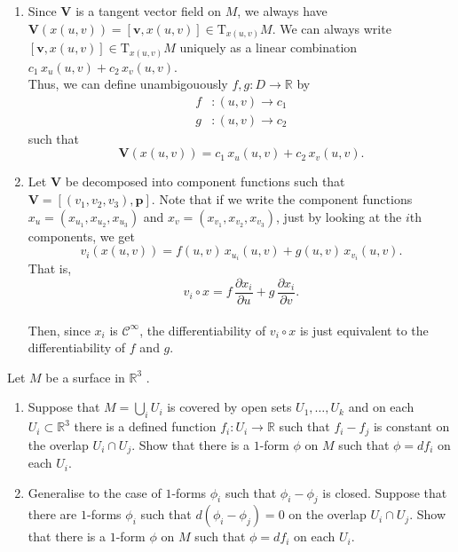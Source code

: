 \documentclass[12 pt, letterpaper]{hmcpset}
\begin{document}
\begin{solution}
	\begin{enumerate}
		\item
			Since $\mathbf{V}$ is a tangent vector field on $M$, we always have $\mathbf{V}(x(u, v)) = [\mathbf{v}, x(u, v)] \in \mathrm{T}_{x(u, v)} M$. We can always write $[\mathbf{v}, x(u, v)] \in \mathrm{T}_{x(u, v)} M$ uniquely as a linear combination $c_{1} \, x_{u}(u, v) + c_{2} \, x_{v}(u, v)$. \\

			Thus, we can define unambigouously $f, g : D \to \mathbb{R}$ by
			\[
				\begin{split}
					f & : (u, v) \to c_1  \\
					g & : (u, v) \to c_{2}
				\end{split}
			\]
			such that
			\[
				\mathbf{V}(x(u, v)) = c_{1} \, x_{u}(u, v) + c_2 \, x_{v}(u, v).
			\]
		\item
			Let $\mathbf{V}$ be decomposed into component functions such that $\mathbf{V} = [(v_{1}, v_{2}, v_{3}), \mathbf{p}]$. Note that if we write the component functions $x_{u} = (x_{u_{1}}, x_{u_{2}}, x_{u_{3}})$ and $x_{v} = (x_{v_{1}}, x_{v_{2}}, x_{v_{3}})$, just by looking at the $i$th components, we get
			\[
				v_{i}(x(u, v)) = f(u, v) \, x_{u_{i}}(u, v) + g(u, v) \, x_{v_i}(u, v).
			\]
			That is,
			\[
				v_{i} \circ x = f \, \frac{\partial x_{i}}{\partial u} + g \, \frac{\partial x_{i}}{\partial v}.
			\] \\
			Then, since $x_{i}$ is $\mathcal{C}^{\infty}$, the differentiability of $v_{i} \circ x$ is just equivalent to the differentiability of $f$ and $g$.
	\end{enumerate}
\end{solution}

\pagebreak

\begin{problem}[Problem 4.]
	Let $M$  be a surface in $\mathbb{R}^{3}$ .
	\begin{enumerate}
		\item Suppose that $M = \bigcup_{i} U_{i}$ is covered by open sets $U_{1}, \dots, U_{k}$ and on each $U_{i} \subset \mathbb{R}^{3}$ there is a defined function $f_{i} : U_{i} \to \mathbb{R}$ such that $f_{i} - f_{j}$ is constant on the overlap $U_{i} \cap U_{j}$. Show that there is a $1$-form $\phi$ on $M$ such that $\phi = df_{i}$ on each $U_{i}$.
		\item Generalise to the case of $1$-forms $\phi_{i}$ such that $\phi_{i} - \phi_{j}$ is closed. Suppose that there are $1$-forms $\phi_{i}$ such that $d(\phi_{i} - \phi_{j}) = 0$ on the overlap $U_{i} \cap U_{j}$. Show that there is a $1$-form $\phi$ on $M$ such that $\phi = df_{i}$ on each $U_{i}$.
	\end{enumerate}
\end{problem}
\end{document}
